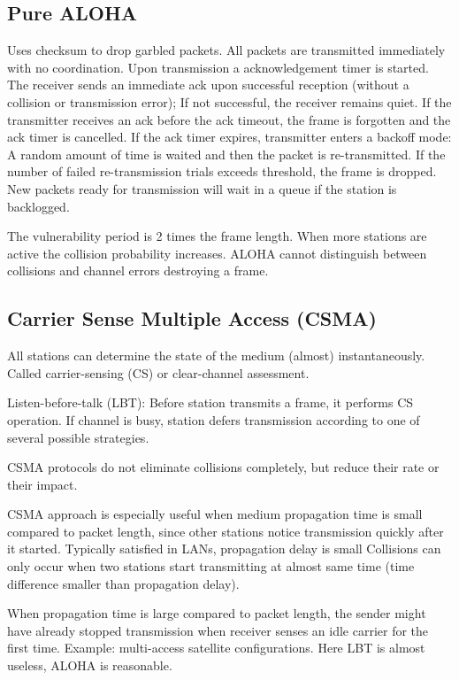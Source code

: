 \documentclass[a4paper,11pt,twocolumn]{article}
\begin{document}
\subsection*{Pure ALOHA}

Uses checksum to drop garbled packets. All packets are transmitted immediately with no coordination. Upon transmission a acknowledgement timer is started. The receiver sends an immediate ack upon successful reception (without a collision or transmission error); If not successful, the receiver remains quiet. If the transmitter receives an ack before the ack timeout, the frame is forgotten and the ack timer is cancelled. If the ack timer expires, transmitter enters a backoff mode: A random amount of time is waited and then the packet is re-transmitted. If the number of failed re-transmission trials exceeds threshold, the frame is dropped. New packets ready for transmission will wait in a queue if the station is backlogged.

The vulnerability period is 2 times the frame length. When more stations are active the collision probability increases. ALOHA cannot distinguish between collisions and channel errors destroying a frame.

\subsection*{Carrier Sense Multiple Access (CSMA)}

All stations can determine the state of the medium (almost) instantaneously. Called carrier-sensing (CS) or clear-channel assessment.

Listen-before-talk (LBT): Before station transmits a frame, it performs CS operation. If channel is busy, station defers transmission according to one of
several possible strategies.

CSMA protocols do not eliminate collisions completely, but reduce
their rate or their impact. 

CSMA approach is especially useful when medium propagation time is small compared to packet length, since other stations notice transmission quickly after it started. Typically satisfied in LANs, propagation delay is small
Collisions can only occur when two stations start transmitting at almost same time (time difference smaller than propagation delay).

When propagation time is large compared to packet length, the
sender might have already stopped transmission when receiver
senses an idle carrier for the first time. Example: multi-access satellite configurations. Here LBT is almost useless, ALOHA is reasonable.
\end{document}
